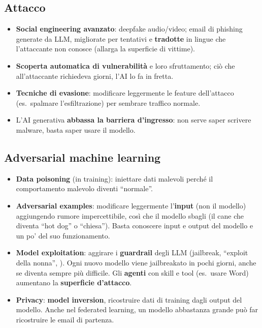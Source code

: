 \subsection{Attacco}
\begin{itemize}
  \item \textbf{Social engineering avanzato}: deepfake audio/video; email di phishing generate da LLM, migliorate per
        tentativi e \textbf{tradotte} in lingue che l'attaccante non conosce (allarga la superficie di vittime).
  \item \textbf{Scoperta automatica di vulnerabilità} e loro sfruttamento; ciò che all'attaccante richiedeva giorni,
        l'AI lo fa in fretta.
  \item \textbf{Tecniche di evasione}: modificare leggermente le feature dell'attacco (es.\ spalmare l'esfiltrazione) per
        sembrare traffico normale.
  \item L'AI generativa \textbf{abbassa la barriera d'ingresso}: non serve saper scrivere malware, basta saper usare il modello.
\end{itemize}

\subsection{Adversarial machine learning}
\begin{itemize}
  \item \textbf{Data poisoning} (in training): iniettare dati malevoli perché il comportamento malevolo diventi ``normale''.
  \item \textbf{Adversarial examples}: modificare leggermente l'\textbf{input} (non il modello) aggiungendo rumore
        impercettibile, così che il modello sbagli (il cane che diventa ``hot dog'' o ``chiesa''). Basta conoscere input
        e output del modello e un po' del suo funzionamento.
  \item \textbf{Model exploitation}: aggirare i \textbf{guardrail} degli LLM (jailbreak, ``exploit della nonna'',
        ). Ogni nuovo modello viene jailbreakato in pochi giorni, anche se diventa sempre più difficile.
        Gli \textbf{agenti} con skill e tool (es.\ usare Word) aumentano la \textbf{superficie d'attacco}.
  \item \textbf{Privacy}: \textbf{model inversion}, ricostruire dati di training dagli output del modello. Anche nel
        federated learning, un modello abbastanza grande può far ricostruire le email di partenza.
\end{itemize}

